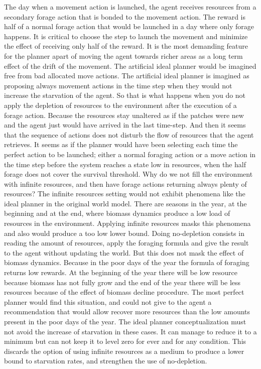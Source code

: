 \documentclass[11pt,oneside,a4paper,openright]{report}
\begin{document}
The day when a movement action is launched, the agent receives resources from a secondary forage action that 
is bonded to the movement action. The reward is half of a normal forage action that would be launched in a 
day where only forage happens. It is critical to choose the step to launch the movement and minimize the 
effect of receiving only half of the reward. It is the most demanding feature for the planner apart of moving 
the agent towards richer areas as a long term effect of the drift of the movement. The artificial ideal planner 
would be imagined free from bad allocated move actions. The artificial ideal planner is imagined as proposing 
always movement actions in the time step when they would not increase the starvation of the agent. So that is 
what happens when you do not apply the depletion of resources to the environment after the execution of a 
forage action. Because the resources stay unaltered as if the patches were new and the agent just would have 
arrived in the last time-step. And then it seems that the sequence of actions does not disturb the flow of 
resources that the agent retrieves. It seems as if the planner would have been selecting each time the perfect 
action to be launched; either a normal foraging action or a move action in the time step before the system reaches 
a state low in resources, when the half forage does not cover the survival threshold. 
Why do we not fill the environment with infinite resources, and then have forage actions returning always
plenty of resources? The infinite resources setting would not exhibit phenomena like the ideal planner in the 
original world model. There are seasons in the year, at the beginning and at the end, where biomass dynamics 
produce a low load of resources in the environment. Applying infinite resources masks this phenomena and also
would produce a too low lower bound. Doing no-depletion consists in reading the amount of resources, apply the 
foraging formula and give the result to the agent without updating the world. But this does not mask the 
effect of biomass dynamics. Because in the poor days of the year the formula of foraging returns low rewards.
At the beginning of the year there will be low resource because biomass has not fully grow and the end of the 
year there will be less resources because of the effect of biomass decline procedure. The most perfect planner 
would find this situation, and could not give to the agent a recommendation that would allow recover more 
resources than the low amounts present in the poor days of the year. The ideal planner conceptualization must 
not avoid the increase of starvation in these cases. It can manage to reduce it to a minimum but can not keep 
it to level zero for ever and for any condition. This discards the option of using infinite resources as a 
medium to produce a lower bound to starvation rates, and strengthen the use of no-depletion.
\end{document}
